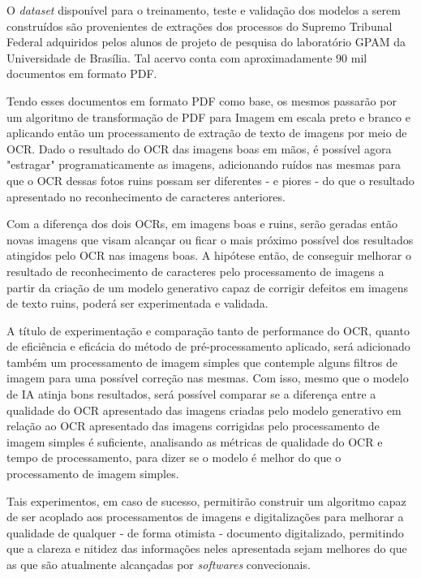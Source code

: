 O \textit{dataset} disponível para o treinamento, teste e validação dos modelos a serem construídos são provenientes de extrações dos processos do Supremo Tribunal Federal adquiridos pelos alunos de projeto de pesquisa do laboratório GPAM da Universidade de Brasília. Tal acervo conta com aproximadamente 90 mil documentos em formato PDF.

Tendo esses documentos em formato PDF como base, os mesmos passarão por um algoritmo de transformação de PDF para Imagem em escala preto e branco e aplicando então um processamento de extração de texto de imagens por meio de OCR. Dado o resultado do OCR das imagens boas em mãos, é possível agora "estragar" programaticamente as imagens, adicionando ruídos nas mesmas para que o OCR dessas fotos ruins possam ser diferentes - e piores - do que o resultado apresentado no reconhecimento de caracteres anteriores.

Com a diferença dos dois OCRs, em imagens boas e ruins, serão geradas então novas imagens que visam alcançar ou ficar o mais próximo possível dos resultados atingidos pelo OCR nas imagens boas. A hipótese então, de conseguir melhorar o resultado de reconhecimento de caracteres pelo processamento de imagens a partir da criação de um modelo generativo capaz de corrigir defeitos em imagens de texto ruins, poderá ser experimentada e validada.

A título de experimentação e comparação tanto de performance do OCR, quanto de eficiência e eficácia do método de pré-processamento aplicado, será adicionado também um processamento de imagem simples que contemple alguns filtros de imagem para uma possível correção nas mesmas. Com isso, mesmo que o modelo de IA atinja bons resultados, será possível comparar se a diferença entre a qualidade do OCR apresentado das imagens criadas pelo modelo generativo em relação ao OCR apresentado das imagens corrigidas pelo processamento de imagem simples é suficiente, analisando as métricas de qualidade do OCR e tempo de processamento, para dizer se o modelo é melhor do que o processamento de imagem simples.

Tais experimentos, em caso de sucesso, permitirão construir um algoritmo capaz de ser acoplado aos processamentos de imagens e digitalizações para melhorar a qualidade de qualquer - de forma otimista - documento digitalizado, permitindo que a clareza e nitidez das informações neles apresentada sejam melhores do que as que são atualmente alcançadas por \textit{softwares} convecionais.



